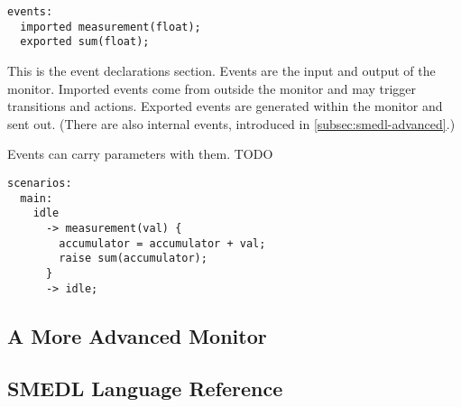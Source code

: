 \documentclass[paper=letter,titlepage,captions=tableheading]{scrartcl}
\begin{document}
\begin{lstlisting}[firstnumber=6,style=smedlfixed]
events:
  imported measurement(float);
  exported sum(float);
\end{lstlisting}

This is the event declarations section. Events are the input and output of the
monitor. Imported events come from outside the monitor and may trigger
transitions and actions. Exported events are generated within the monitor and
sent out. (There are also internal events, introduced in \autoref{subsec:smedl-advanced}.)

Events can carry parameters with them. TODO

\begin{lstlisting}[firstnumber=10,style=smedlfixed]
scenarios:
  main:
    idle
      -> measurement(val) {
        accumulator = accumulator + val;
        raise sum(accumulator);
      }
      -> idle;
\end{lstlisting}

\subsection{A More Advanced Monitor}
\label{subsec:smedl-advanced}


\subsection{SMEDL Language Reference}
\label{subsec:smedl-ref}




\end{document}
